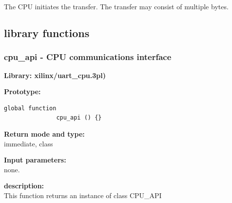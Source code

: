             The CPU initiates the transfer. The transfer may consist of
            multiple bytes.



    \subsection{library functions}

        \subsubsection{cpu\_api - CPU communications interface}\label{sec:lfcpuapi}

            {\bf Library: xilinx/uart\_cpu.3pl)}

            {\bf Prototype:} \\
            \vsp
            \begin{lstlisting}[gobble=12, language=threepl]
               global function
               cpu_api () {}
            \end{lstlisting}

            {\bf Return mode and type:} \\
            immediate, class

            {\bf Input parameters:} \\            
            
            none.
            
            {\bf description:} \\
            This function returns an instance of class CPU\_API













